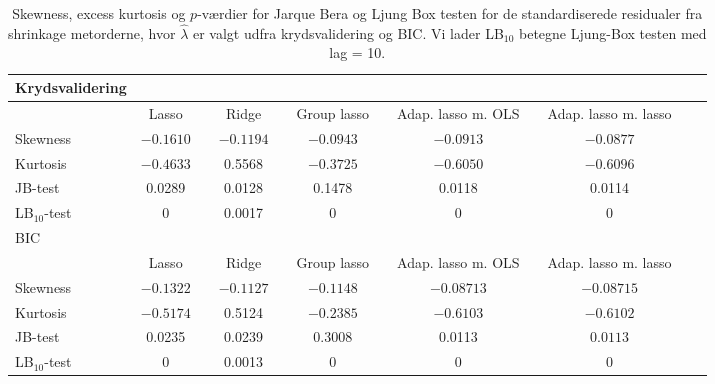 \begin{sidewaystable} 
\center
\begin{tabular}{lccccccccccc} 
Krydsvalidering\\
\toprule
& Lasso && Ridge  && Group lasso  && Adap. lasso m. OLS  && Adap. lasso m. lasso \\ \midrule
Skewness & $-0.1610$ &&$-0.1194$ && $-0.0943$ & &   $-0.0913$ && $-0.0877$  \\
Kurtosis & $ -0.4633 $ && 0.5568 &&  $-0.3725$ &&    $-0.6050 $ && $-0.6096$ \\
JB-test & 0.0289 && 0.0128 &&  0.1478  &&  0.0118 &&  0.0114  \\
LB$_{10}$-test &  0  && 0.0017 && 0  &&  0&  & 0  \\ \bottomrule \toprule
BIC\\ \midrule
& Lasso && Ridge &&Group lasso &  & Adap. lasso m. OLS && Adap. lasso m. lasso  \\ \midrule
Skewness &$-0.1322$ && $-0.1127$ && $-0.1148$ & & $-0.08713$ && $-0.08715$ \\
Kurtosis & $-0.5174$ && 0.5124 &&$-0.2385$ && $-0.6103$ && $-0.6102$\\
JB-test & 0.0235 && 0.0239 && 0.3008   &&   0.0113 &&$0.0113$\\
LB$_{10}$-test & 0 &&  0.0013 && 0  &  & 0 &&  0 \\  \bottomrule
 \end{tabular}
\caption{Skewness, excess kurtosis og \(p\)-værdier for Jarque Bera og Ljung Box testen for de standardiserede residualer fra shrinkage metorderne, hvor $\widehat{\lambda}$ er valgt udfra krydsvalidering og BIC. Vi lader LB$_{10}$ betegne Ljung-Box testen med lag = 10. } \label{tab:res_shrinkage_tab}
\end{sidewaystable}
